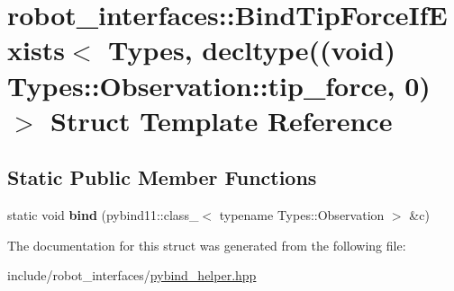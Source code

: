 \hypertarget{structrobot__interfaces_1_1BindTipForceIfExists_3_01Types_00_01decltype_07_07void_08_01Types_1_14cbc6933c476f63b7bfd2943748e44ea}{}\section{robot\+\_\+interfaces\+:\+:Bind\+Tip\+Force\+If\+Exists$<$ Types, decltype((void) Types\+:\+:Observation\+:\+:tip\+\_\+force, 0)$>$ Struct Template Reference}
\label{structrobot__interfaces_1_1BindTipForceIfExists_3_01Types_00_01decltype_07_07void_08_01Types_1_14cbc6933c476f63b7bfd2943748e44ea}
\subsection*{Static Public Member Functions}
\begin{DoxyCompactItemize}
\item 
\mbox{\label{structrobot__interfaces_1_1BindTipForceIfExists_3_01Types_00_01decltype_07_07void_08_01Types_1_14cbc6933c476f63b7bfd2943748e44ea_a5cb65328e38a607f45deea27085f575f}} 
static void {\bfseries bind} (pybind11\+::class\+\_\+$<$ typename Types\+::\+Observation $>$ \&c)
\end{DoxyCompactItemize}


The documentation for this struct was generated from the following file\+:\begin{DoxyCompactItemize}
\item 
include/robot\+\_\+interfaces/\hyperlink{pybind__helper_8hpp}{pybind\+\_\+helper.\+hpp}\end{DoxyCompactItemize}
